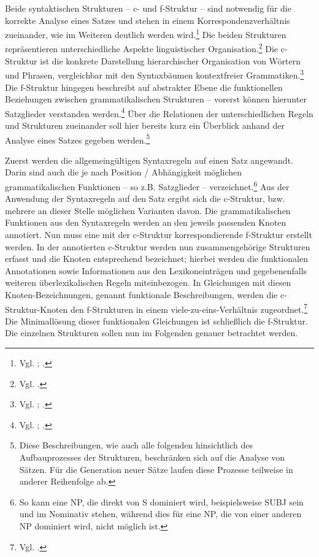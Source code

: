 \documentclass[12pt,a4paper]{article}
\begin{document}
Beide syntaktischen Strukturen -- c- und f-Struktur -- sind notwendig für die korrekte Analyse eines Satzes und stehen in einem Korrespondenzverhältnis zueinander, wie im Weiteren deutlich werden wird.\footnote{Vgl. \cite[3]{Dal}; \cite[4]{Skript}.} Die beiden Strukturen repräsentieren unterschiedliche Aspekte linguistischer Organisation.\footnote{Vgl. \cite[1]{Dal}.} Die c-Struktur ist die konkrete Darstellung hierarchischer Organisation von Wörtern und Phrasen, vergleichbar mit den Syntaxbäumen kontextfreier Grammatiken.\footnote{Vgl. \cite[7]{Dal}; \cite[13]{Rohrer}.} Die f-Struktur hingegen beschreibt auf abstrakter Ebene die funktionellen Beziehungen zwischen grammatikalischen Strukturen -- vorerst können hierunter Satzglieder verstanden werden.\footnote{Vgl. \cite[7]{Dal}; \cite[4]{Skript}.} Über die Relationen der unterschiedlichen Regeln und Strukturen zueinander soll hier bereits kurz ein Überblick anhand der Analyse eines Satzes gegeben werden.\footnote{Diese Beschreibungen, wie auch alle folgenden hinsichtlich des Aufbauprozesses der Strukturen, beschränken sich auf die Analyse von Sätzen. Für die Generation neuer Sätze laufen diese Prozesse teilweise in anderer Reihenfolge ab.}

Zuerst werden die allgemeingültigen Syntaxregeln auf einen Satz angewandt. Darin sind auch die je nach Position / Abhängigkeit möglichen grammatikalischen Funktionen -- so z.B. Satzglieder -- verzeichnet.\footnote{So kann eine NP, die direkt von S dominiert wird, beispielsweise SUBJ sein und im Nominativ stehen, während dies für eine NP, die von einer anderen NP dominiert wird, nicht möglich ist.} Aus der Anwendung der Syntaxregeln auf den Satz ergibt sich die c-Struktur, bzw. mehrere an dieser Stelle möglichen Varianten davon. Die grammatikalischen Funktionen aus den Syntaxregeln werden an den jeweils passenden Knoten annotiert. Nun muss eine mit der c-Struktur korrespondierende f-Struktur erstellt werden. In der annotierten c-Struktur werden nun zusammengehörige Strukturen erfasst und die Knoten entsprechend bezeichnet; hierbei werden die funktionalen Annotationen sowie Informationen aus den Lexikoneinträgen und gegebenenfalls weiteren überlexikalischen Regeln miteinbezogen. In Gleichungen mit diesen Knoten-Bezeichnungen, genannt funktionale Beschreibungen, werden die c-Struktur-Knoten den f-Strukturen in einem viele-zu-eins-Verhältnis zugeordnet.\footnote{Vgl. \cite[9]{Skript}.} Die Minimallösung dieser funktionalen Gleichungen ist schließlich die f-Struktur.
Die einzelnen Strukturen sollen nun im Folgenden genauer betrachtet werden.
\end{document}
